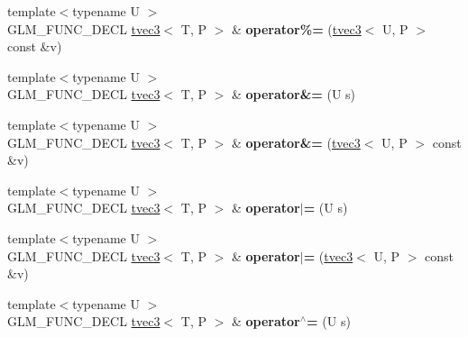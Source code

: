 \begin{DoxyCompactItemize}
\item 
\hypertarget{structglm_1_1detail_1_1tvec3_ad99c15901cce70147d1264b4ee5f57fd}{{\footnotesize template$<$typename U $>$ }\\G\-L\-M\-\_\-\-F\-U\-N\-C\-\_\-\-D\-E\-C\-L \hyperlink{structglm_1_1detail_1_1tvec3}{tvec3}$<$ T, P $>$ \& {\bfseries operator\%=} (\hyperlink{structglm_1_1detail_1_1tvec3}{tvec3}$<$ U, P $>$ const \&v)}\label{structglm_1_1detail_1_1tvec3_ad99c15901cce70147d1264b4ee5f57fd}

\item 
\hypertarget{structglm_1_1detail_1_1tvec3_a295867db452780e8c812175b0b3eb2be}{{\footnotesize template$<$typename U $>$ }\\G\-L\-M\-\_\-\-F\-U\-N\-C\-\_\-\-D\-E\-C\-L \hyperlink{structglm_1_1detail_1_1tvec3}{tvec3}$<$ T, P $>$ \& {\bfseries operator\&=} (U s)}\label{structglm_1_1detail_1_1tvec3_a295867db452780e8c812175b0b3eb2be}

\item 
\hypertarget{structglm_1_1detail_1_1tvec3_ab39bbc25edd4ae5ac2685c5354eb7a2d}{{\footnotesize template$<$typename U $>$ }\\G\-L\-M\-\_\-\-F\-U\-N\-C\-\_\-\-D\-E\-C\-L \hyperlink{structglm_1_1detail_1_1tvec3}{tvec3}$<$ T, P $>$ \& {\bfseries operator\&=} (\hyperlink{structglm_1_1detail_1_1tvec3}{tvec3}$<$ U, P $>$ const \&v)}\label{structglm_1_1detail_1_1tvec3_ab39bbc25edd4ae5ac2685c5354eb7a2d}

\item 
\hypertarget{structglm_1_1detail_1_1tvec3_a818c3ac164bed3ed6eda1842e3d23190}{{\footnotesize template$<$typename U $>$ }\\G\-L\-M\-\_\-\-F\-U\-N\-C\-\_\-\-D\-E\-C\-L \hyperlink{structglm_1_1detail_1_1tvec3}{tvec3}$<$ T, P $>$ \& {\bfseries operator$\vert$=} (U s)}\label{structglm_1_1detail_1_1tvec3_a818c3ac164bed3ed6eda1842e3d23190}

\item 
\hypertarget{structglm_1_1detail_1_1tvec3_a605cec2d55f9419c2135027f4cd80a22}{{\footnotesize template$<$typename U $>$ }\\G\-L\-M\-\_\-\-F\-U\-N\-C\-\_\-\-D\-E\-C\-L \hyperlink{structglm_1_1detail_1_1tvec3}{tvec3}$<$ T, P $>$ \& {\bfseries operator$\vert$=} (\hyperlink{structglm_1_1detail_1_1tvec3}{tvec3}$<$ U, P $>$ const \&v)}\label{structglm_1_1detail_1_1tvec3_a605cec2d55f9419c2135027f4cd80a22}

\item 
\hypertarget{structglm_1_1detail_1_1tvec3_a5485429a19dda771abed1aaa2784d999}{{\footnotesize template$<$typename U $>$ }\\G\-L\-M\-\_\-\-F\-U\-N\-C\-\_\-\-D\-E\-C\-L \hyperlink{structglm_1_1detail_1_1tvec3}{tvec3}$<$ T, P $>$ \& {\bfseries operator$^\wedge$=} (U s)}\label{structglm_1_1detail_1_1tvec3_a5485429a19dda771abed1aaa2784d999}


\end{DoxyCompactItemize}
